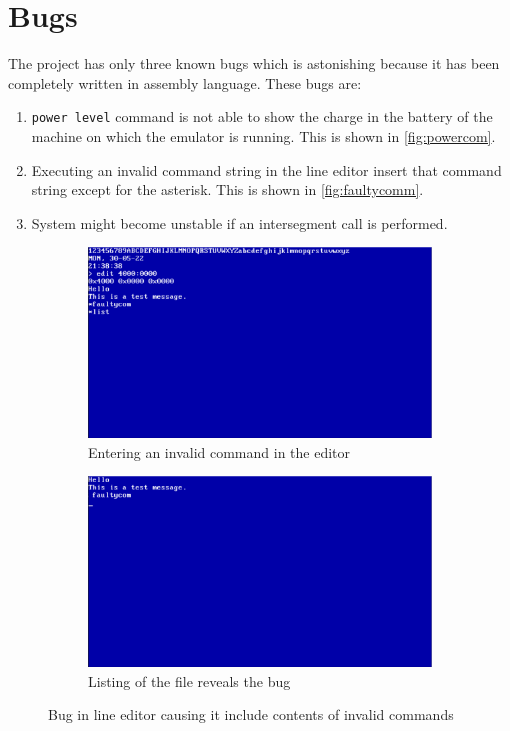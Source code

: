 \section{Bugs}
The project has only three known bugs which is astonishing because it has been completely written in assembly language. These bugs are:
\begin{enumerate}
  \item \texttt{power level} command is not able to show the charge in the battery of the machine on which the emulator is running. This is shown in \autoref{fig:powercom}.
  \item Executing an invalid command string in the line editor insert that command string except for the asterisk. This is shown in \autoref{fig:faultycomm}.
  \item System might become unstable if an intersegment call is performed.
\end{enumerate}
\begin{figure}[H]
  \begin{subfigure}{.5\textwidth}
  \centering
  \includegraphics[scale=0.13]{figures/faultycomm1.eps}
  \caption{Entering an invalid command in the editor}
  \label{fig:faultycomm1}
  \end{subfigure}
  \begin{subfigure}{.5\textwidth}
  \centering
  \includegraphics[scale=0.13]{figures/faultycomm2.eps}
  \caption{Listing of the file reveals the bug}
  \label{fig:faultycomm2}  
  \end{subfigure}
\caption{Bug in line editor causing it include contents of invalid commands}
\label{fig:faultycomm}
\end{figure}

